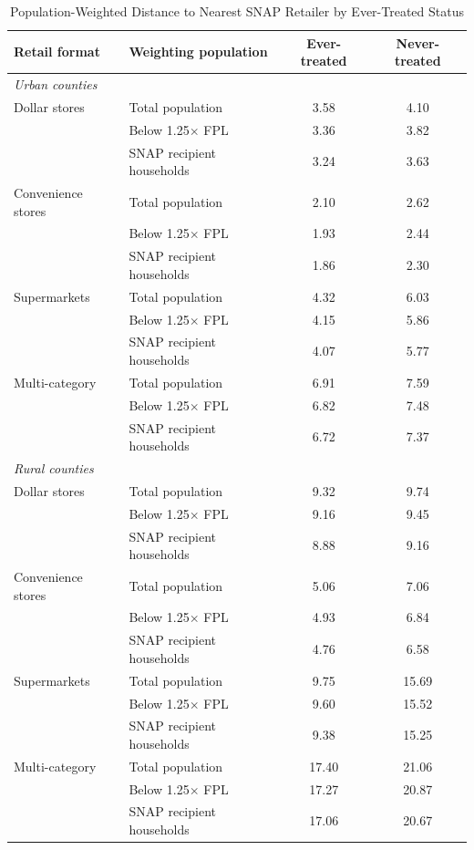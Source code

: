 \documentclass[12pt]{article}
\begin{document}
\begin{table}[!htbp]
\centering
\caption{Population-Weighted Distance to Nearest SNAP Retailer by Ever-Treated Status}
\label{tab:weighted-distance-evertreated}
\begin{threeparttable}
\small
\begin{tabular}{llcc}
\toprule
Retail format & Weighting population & Ever-treated & Never-treated \\
\midrule
\multicolumn{4}{l}{\textit{Urban counties}} \\
Dollar stores & Total population & 3.58 & 4.10 \\
              & Below 1.25$\times$ FPL & 3.36 & 3.82 \\
              & SNAP recipient households & 3.24 & 3.63 \\
Convenience stores & Total population & 2.10 & 2.62 \\
              & Below 1.25$\times$ FPL & 1.93 & 2.44 \\
              & SNAP recipient households & 1.86 & 2.30 \\
Supermarkets & Total population & 4.32 & 6.03 \\
              & Below 1.25$\times$ FPL & 4.15 & 5.86 \\
              & SNAP recipient households & 4.07 & 5.77 \\
Multi-category & Total population & 6.91 & 7.59 \\
              & Below 1.25$\times$ FPL & 6.82 & 7.48 \\
              & SNAP recipient households & 6.72 & 7.37 \\
\midrule
\multicolumn{4}{l}{\textit{Rural counties}} \\
Dollar stores & Total population & 9.32 & 9.74 \\
              & Below 1.25$\times$ FPL & 9.16 & 9.45 \\
              & SNAP recipient households & 8.88 & 9.16 \\
Convenience stores & Total population & 5.06 & 7.06 \\
              & Below 1.25$\times$ FPL & 4.93 & 6.84 \\
              & SNAP recipient households & 4.76 & 6.58 \\
Supermarkets & Total population & 9.75 & 15.69 \\
              & Below 1.25$\times$ FPL & 9.60 & 15.52 \\
              & SNAP recipient households & 9.38 & 15.25 \\
Multi-category & Total population & 17.40 & 21.06 \\
              & Below 1.25$\times$ FPL & 17.27 & 20.87 \\
              & SNAP recipient households & 17.06 & 20.67 \\
\bottomrule
\end{tabular}


\end{threeparttable}
\end{table}
\end{document}
